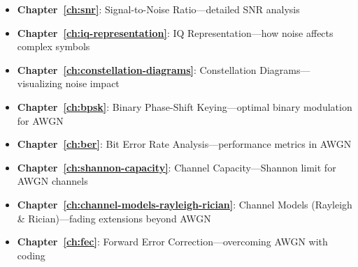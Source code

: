 \begin{itemize}
\item \textbf{Chapter~\ref{ch:snr}}: Signal-to-Noise Ratio---detailed SNR analysis
\item \textbf{Chapter~\ref{ch:iq-representation}}: IQ Representation---how noise affects complex symbols
\item \textbf{Chapter~\ref{ch:constellation-diagrams}}: Constellation Diagrams---visualizing noise impact
\item \textbf{Chapter~\ref{ch:bpsk}}: Binary Phase-Shift Keying---optimal binary modulation for AWGN
\item \textbf{Chapter~\ref{ch:ber}}: Bit Error Rate Analysis---performance metrics in AWGN
\item \textbf{Chapter~\ref{ch:shannon-capacity}}: Channel Capacity---Shannon limit for AWGN channels
\item \textbf{Chapter~\ref{ch:channel-models-rayleigh-rician}}: Channel Models (Rayleigh \& Rician)---fading extensions beyond AWGN
\item \textbf{Chapter~\ref{ch:fec}}: Forward Error Correction---overcoming AWGN with coding
\end{itemize}
